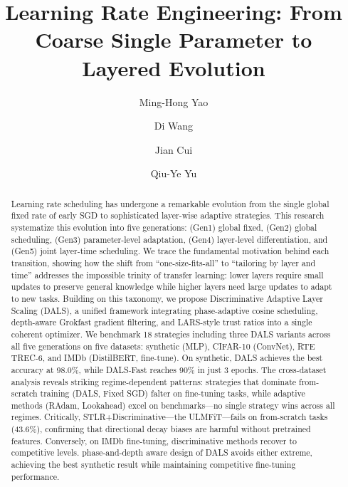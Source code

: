\documentclass[a4paper,fleqn]{cas-dc}
\begin{document}
\let\WriteBookmarks\relax
\def\floatpagepagefraction{1}
\def\textpagefraction{.001}



\title [mode = title]{Learning Rate Engineering: From Coarse Single Parameter to Layered Evolution}

\author[1]{Ming-Hong Yao}
\author[1]{Di Wang}
\author[1]{Jian Cui}
\author[1]{Qiu-Ye Yu}\cormark[1]



\begin{abstract}
Learning rate scheduling has undergone a remarkable evolution from the single global fixed rate of early SGD to sophisticated layer-wise adaptive strategies. This research systematize this evolution into five generations: (Gen1) global fixed, (Gen2) global scheduling, (Gen3) parameter-level adaptation, (Gen4) layer-level differentiation, and (Gen5) joint layer-time scheduling. We trace the fundamental motivation behind each transition, showing how the shift from ``one-size-fits-all'' to ``tailoring by layer and time'' addresses the impossible trinity of transfer learning: lower layers require small updates to preserve general knowledge while higher layers need large updates to adapt to new tasks. Building on this taxonomy, we propose Discriminative Adaptive Layer Scaling (DALS), a unified framework integrating phase-adaptive cosine scheduling, depth-aware Grokfast gradient filtering, and LARS-style trust ratios into a single coherent optimizer. We benchmark 18 strategies including three DALS variants across all five generations on five datasets: synthetic (MLP), CIFAR-10 (ConvNet), RTE TREC-6, and IMDb (DistilBERT, fine-tune). On synthetic, DALS achieves the best accuracy at 98.0\%, while DALS-Fast reaches 90\% in just 3 epochs. The cross-dataset analysis reveals striking regime-dependent patterns: strategies that dominate from-scratch training (DALS, Fixed SGD) falter on fine-tuning tasks, while adaptive methods (RAdam, Lookahead) excel on benchmarks---no single strategy wins across all regimes. Critically, STLR+Discriminative---the ULMFiT---fails on from-scratch tasks (43.6\%), confirming that directional decay biases are harmful without pretrained features. Conversely, on IMDb fine-tuning, discriminative methods recover to competitive levels. phase-and-depth aware design of DALS avoids either extreme, achieving the best synthetic result while maintaining competitive fine-tuning performance.
\end{abstract}
\end{document}
